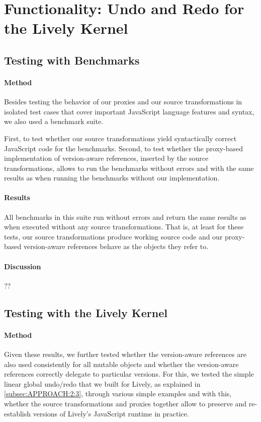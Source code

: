 \section{Functionality: Undo and Redo for the Lively Kernel} \label{sec:DISCUSSION:1}


\subsection{Testing with Benchmarks}

\paragraph{Method}
Besides testing the behavior of our proxies and our source transformations in isolated test cases that cover important JavaScript language features and syntax, we also used a benchmark suite.

First, to test whether our source transformations yield syntactically correct JavaScript code for the benchmarks.
Second, to test whether the proxy-based implementation of version-aware references, inserted by the source transformations, allows to run the benchmarks without errors and with the same results as when running the benchmarks without our implementation.


\paragraph{Results}
All benchmarks in this suite run without errors and return the same results as when executed without any source transformations.
That is, at least for these tests, our source transformations produce working source code and our proxy-based version-aware references behave as the objects they refer to.

\paragraph{Discussion}
??


\subsection{Testing with the Lively Kernel}

\paragraph{Method}
Given these results, we further tested whether the version-aware references are also used consistently for all mutable objects and whether the version-aware references correctly delegate to particular versions.
For this, we tested the simple linear global undo/redo that we built for Lively, as explained in \ref{subsec:APPROACH:2:3}, through various simple examples and with this, whether the source transformations and proxies together allow to preserve and re-establish versions of Lively's JavaScript runtime in practice.

